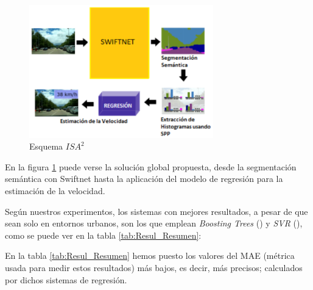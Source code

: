 \begin{figure}[H]
  \centering
  \includegraphics[width=8cm]{Figuras/Figura_Esquema_ISA2_Version_2.eps}
  \caption{Esquema $ISA^{2}$}
  \label{fig:isa2}
\end{figure}

En la figura \ref{fig:isa2} puede verse la solución global propuesta, desde la segmentación semántica con Swiftnet hasta la aplicación del modelo de regresión para la estimación de la velocidad.


Según nuestros experimentos, los sistemas con mejores resultados, a pesar de que sean solo en entornos urbanos, son los que emplean \textit{Boosting Trees} (\cite{boosting-trees}) y \textit{\ac{SVR}} (\cite{SVR}), como se puede ver en la tabla \ref{tab:Resul_Resumen}:

\begin{table}[H]
\centering
{}
\caption{Resultados de Boosting Trees y \ac{SVR}}
\label{tab:Resul_Resumen}
\end{table}

En la tabla \ref{tab:Resul_Resumen} hemos puesto los valores del \ac{MAE} (métrica usada para medir estos resultados) más bajos, es decir, más precisos; calculados por dichos sistemas de regresión.

